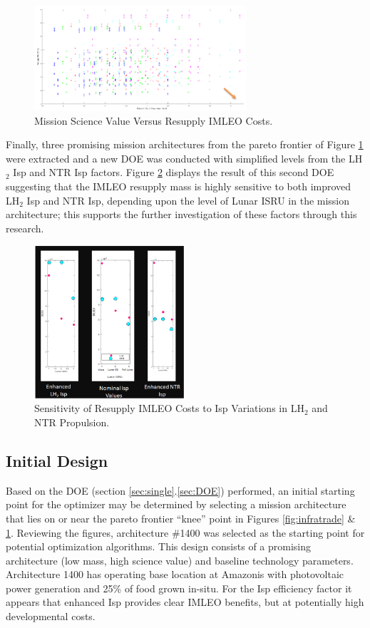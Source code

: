 \documentclass[]{aiaa-pretty}
\begin{document}
\begin{figure}[h!]
	\centering
	\includegraphics[width=0.7\textwidth]{fulltrade}
	\caption{Mission Science Value Versus Resupply IMLEO Costs.}
	\label{fig:fulltrade}
\end{figure}

Finally, three promising mission architectures from the pareto frontier of Figure \ref{fig:fulltrade} were extracted and a new DOE was conducted with simplified levels from the  LH$_2$ Isp and NTR Isp factors. Figure \ref{fig:senstrade} displays the result of this second DOE suggesting that the IMLEO resupply mass is highly sensitive to both improved  LH$_2$ Isp and NTR Isp, depending upon the level of Lunar ISRU in the mission architecture; this supports the further investigation of these factors through this research.

\begin{figure}[ht!]
	\centering
	\includegraphics[width=0.5\textwidth]{improvetrade}
	\caption{Sensitivity of Resupply IMLEO Costs to Isp Variations in LH$_2$ and NTR Propulsion.}
	\label{fig:senstrade}
\end{figure}


\subsection{Initial Design}
Based on the DOE (section \ref{sec:single}.\ref{sec:DOE}) performed, an initial starting point for the optimizer may be determined by selecting a mission architecture that lies on or near the pareto frontier “knee” point in Figures \ref{fig:infratrade} \& \ref{fig:fulltrade}. Reviewing the figures, architecture \#1400 was selected as the starting point for potential optimization algorithms. This design  consists of a promising architecture (low mass, high science value) and baseline technology parameters. Architecture 1400 has operating base location at Amazonis with photovoltaic power generation and 25\% of food grown in-situ. For the Isp efficiency factor it appears that enhanced Isp provides clear IMLEO benefits, but at potentially high developmental costs.
\end{document}
